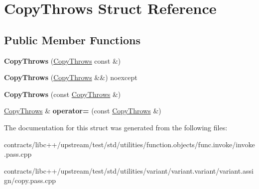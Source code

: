 \hypertarget{struct_copy_throws}{}\section{Copy\+Throws Struct Reference}
\label{struct_copy_throws}
\subsection*{Public Member Functions}
\begin{DoxyCompactItemize}
\item 
\mbox{\label{struct_copy_throws_a7531e4ec4b58dbf3c484ad20dc063c61}} 
{\bfseries Copy\+Throws} (\mbox{\hyperlink{struct_copy_throws}{Copy\+Throws}} const \&)
\item 
\mbox{\label{struct_copy_throws_af99dab7ede84ac42d5e9936dea940b44}} 
{\bfseries Copy\+Throws} (\mbox{\hyperlink{struct_copy_throws}{Copy\+Throws}} \&\&) noexcept
\item 
\mbox{\label{struct_copy_throws_a2f8c397dea3245fedf576023b6387030}} 
{\bfseries Copy\+Throws} (const \mbox{\hyperlink{struct_copy_throws}{Copy\+Throws}} \&)
\item 
\mbox{\label{struct_copy_throws_a0dfc1704fd34da535cfc32f7bdfac163}} 
\mbox{\hyperlink{struct_copy_throws}{Copy\+Throws}} \& {\bfseries operator=} (const \mbox{\hyperlink{struct_copy_throws}{Copy\+Throws}} \&)
\end{DoxyCompactItemize}


The documentation for this struct was generated from the following files\+:\begin{DoxyCompactItemize}
\item 
contracts/libc++/upstream/test/std/utilities/function.\+objects/func.\+invoke/invoke.\+pass.\+cpp\item 
contracts/libc++/upstream/test/std/utilities/variant/variant.\+variant/variant.\+assign/copy.\+pass.\+cpp\end{DoxyCompactItemize}
